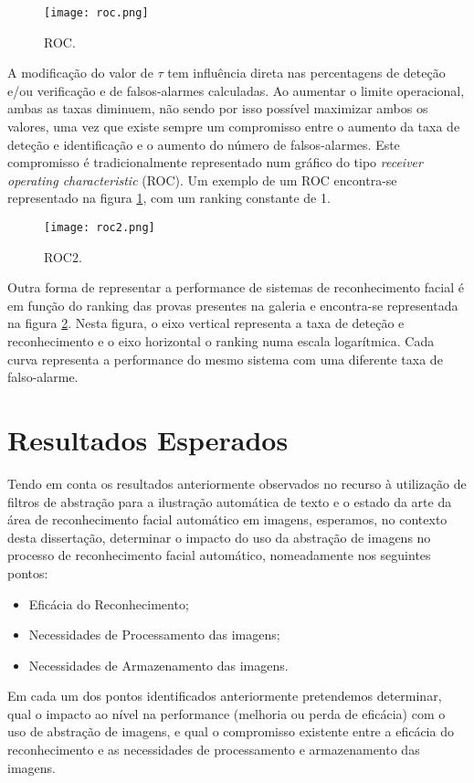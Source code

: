 \begin{figure}[ht]
  \begin{center}
    \leavevmode
    \texttt{[image: roc.png]}
    \caption{ROC.}	
    \label{fig:roc}
  \end{center}
\end{figure}
A modificação do valor de $\tau$ tem influência direta nas percentagens de deteção e/ou verificação e de falsos-alarmes calculadas. Ao aumentar o limite operacional, ambas as taxas diminuem, não sendo por isso possível maximizar ambos os valores, uma vez que existe sempre um compromisso entre o aumento da taxa de deteção e identificação e o aumento do número de falsos-alarmes. Este compromisso é tradicionalmente representado num gráfico do tipo \textit{receiver operating characteristic} (ROC). Um exemplo de um ROC encontra-se representado na figura \ref{fig:roc}, com um ranking constante de 1. 

\begin{figure}[ht]
  \begin{center}
    \leavevmode
    \texttt{[image: roc2.png]}
    \caption{ROC2.}	
    \label{fig:roc2}
  \end{center}
\end{figure}
Outra forma de representar a performance de sistemas de reconhecimento facial é em função do ranking das provas presentes na galeria e encontra-se representada na figura \ref{fig:roc2}. Nesta figura, o eixo vertical representa a taxa de deteção e reconhecimento e o eixo horizontal o ranking numa escala logarítmica. Cada curva representa a performance do mesmo sistema com uma diferente taxa de falso-alarme.

\section{Resultados Esperados}
Tendo em conta os resultados anteriormente observados no recurso à utilização de filtros de abstração para a ilustração automática de texto e o estado da arte da área de reconhecimento facial automático em imagens, esperamos, no contexto desta dissertação, determinar o impacto do uso da abstração de imagens no processo de reconhecimento facial automático, nomeadamente nos seguintes pontos:
\begin{itemize}
\item Eficácia do Reconhecimento;
\item Necessidades de Processamento das imagens;
\item Necessidades de Armazenamento das imagens.
\end{itemize}
Em cada um dos pontos identificados anteriormente pretendemos determinar, qual o impacto ao nível na performance (melhoria ou perda de eficácia) com o uso de abstração de imagens, e qual o compromisso existente entre a eficácia do reconhecimento e as necessidades de processamento e armazenamento das imagens.

